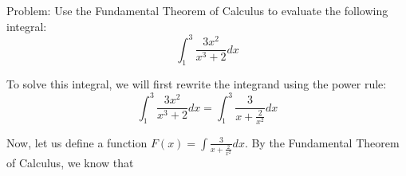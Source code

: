 \question Problem: Use the Fundamental Theorem of Calculus to evaluate the following integral:
$$ \int_1^3 \frac{3x^2}{x^3+2}dx $$
\begin{solution}
To solve this integral, we will first rewrite the integrand using the power rule:
$$ \int_1^3 \frac{3x^2}{x^3+2}dx = \int_1^3 \frac{3}{x+\frac{2}{x^2}}dx $$

Now, let us define a function $F(x) = \int \frac{3}{x+\frac{2}{x^2}}dx $. By the Fundamental Theorem of Calculus, we know that
\end{solution}
